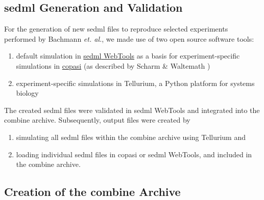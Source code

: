\subsection*{\acs{sedml} Generation and Validation}
For the generation of new \ac{sedml} files to reproduce selected experiments performed by Bachmann \textit{et. al.}, we made use of two open source software tools:
\begin{enumerate}
    \item default simulation in \hyperlink{http://sysbioapps.spdns.org/SED-ML_Web_Tools}{\ac{sedml} WebTools} as a basis for experiment-specific simulations in \hyperlink{http://copasi.org/}{\ac{copasi}} (as described by Scharm \& Waltemath \cite{combine})
    \item experiment-specific simulations in Tellurium, a Python platform for systems biology \cite{tellurium}
\end{enumerate}

The created \ac{sedml} files were validated in \ac{sedml} WebTools and integrated into the \ac{combine} archive. Subsequently, output files were created by

\begin{enumerate}
    \item simulating all \ac{sedml} files within the \ac{combine} archive using Tellurium and
    \item loading individual \ac{sedml} files in \ac{copasi} or \ac{sedml} WebTools, and included in the \ac{combine} archive.
\end{enumerate}

\subsection*{Creation of the \acs{combine} Archive}

